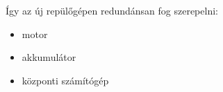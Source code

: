 \documentclass[12pt]{article}
\begin{document}
\begin{itemize}
\begin{figure}[H]
	\centering
	\caption{}
	\label{fig:orca}
\end{figure}

Így az új repül\H{o}gépen redundánsan fog szerepelni:
\begin{itemize}
\item motor
\item akkumulátor
\item központi számítógép
\end{itemize}


\begin{figure}[H]
	\centering
	\caption{}
	\label{fig:sys}
\end{figure}


\end{itemize}
\end{document}

